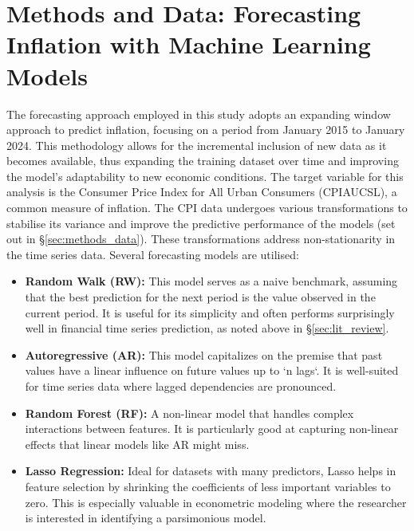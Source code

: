 \section{Methods and Data: Forecasting Inflation with Machine Learning Models} \label{sec:methods}

The forecasting approach employed in this study adopts an expanding window approach to predict inflation, focusing on a period from January 2015 to January 2024. This methodology allows for the incremental inclusion of new data as it becomes available, thus expanding the training dataset over time and improving the model's adaptability to new economic conditions. The target variable for this analysis is the Consumer Price Index for All Urban Consumers (CPIAUCSL), a common measure of inflation. The CPI data undergoes various transformations to stabilise its variance and improve the predictive performance of the models (set out in \S \ref{sec:methods_data}). These transformations address non-stationarity in the time series data. Several forecasting models are utilised:

\begin{itemize}
    \item \textbf{Random Walk (RW):} This model serves as a naive benchmark, assuming that the best prediction for the next period is the value observed in the current period. It is useful for its simplicity and often performs surprisingly well in financial time series prediction, as noted above in \S \ref{sec:lit_review}.
    \item \textbf{Autoregressive (AR):} This model capitalizes on the premise that past values have a linear influence on future values up to `n lags`. It is well-suited for time series data where lagged dependencies are pronounced.
    \item \textbf{Random Forest (RF):} A non-linear model that handles complex interactions between features. It is particularly good at capturing non-linear effects that linear models like AR might miss.
    \item \textbf{Lasso Regression:} Ideal for datasets with many predictors, Lasso helps in feature selection by shrinking the coefficients of less important variables to zero. This is especially valuable in econometric modeling where the researcher is interested in identifying a parsimonious model.
\end{itemize}


